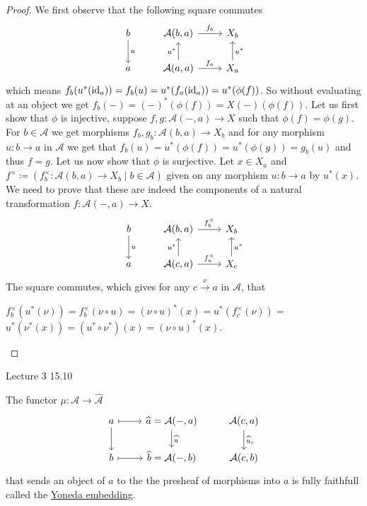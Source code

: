 \begin{proof}
    We first observe that the following square commutes
    \[
    \begin{tikzcd}
        b
        \arrow[d,"u"]
        &
        \mathcal{A}(b,a)
        \arrow[r,"f_b"]
        &
        X_b
        \\
        a
        &
        \mathcal{A}(a,a)
        \arrow[u,"u^*"]
        \arrow[r,"f_a"]
        &
        X_a
        \arrow[u,"u^*"']
    \end{tikzcd}
    \]
    which means $f_b(u^*(\operatorname{id}_a))=f_b(u)=u^*(f_a(\operatorname{id}_a))=u^*(\phi(f))$.
    So without evaluating at an object we get $f_b(-) = (-)^*(\phi(f))=X(-)(\phi(f))$.
    Let us first show that $\phi$ is injective, suppose $f,g\colon\mathcal{A}(-,a) \to X$ such that $\phi(f)=\phi(g)$.
    For $b \in \mathcal{A}$ we get morphisms $f_b,g_b\colon\mathcal{A}(b,a) \to X_b$ and for any morphism $u:b\to a$ in $\mathcal{A}$ we get that $f_b(u)=u^*(\phi(f))=u^*(\phi(g))=g_b(u)$ and thus $f=g$.
    Let us now show that $\phi$ is surjective.
    Let $x \in X_a$ and $f^\times\coloneqq ( f_b^\times\colon \mathcal{A}(b,a) \to X_b \mid b \in \mathcal{A})$ given on any morphism $u\colon b \to a$ by $u^*(x)$.
    We need to prove that these are indeed the components of a natural transformation $f\colon \mathcal{A}(-,a) \to X$.
    \[
    \begin{tikzcd}
        b
        \arrow[d,"u"]
        &
        \mathcal{A}(b,a)
        \arrow[r,"f_b^\times"]
        &
        X_b
        \\
        a
        &
        \mathcal{A}(c,a)
        \arrow[u,"u^*"]
        \arrow[r,"f_a^\times"]
        &
        X_c
        \arrow[u,"u^*"']
    \end{tikzcd}
    \]
    The square commutes, which gives for any $c \xrightarrow{\nu} a$ in $\mathcal{A}$, that 
    \begin{center}
        $f_b^\times(u^*(\nu)) = f_b^\times(\nu \circ u) = ( \nu \circ u)^*(x) =u^*(f^\times_c(\nu)) = $
        \\
        $u^*(\nu^*(x))=(u^* \circ \nu^*)(x)= (\nu \circ u)^*(x)$.
    \end{center}
\end{proof}

Lecture 3 15.10

\begin{thm}
\label{yoneda_embedding}
    The functor $\mu: \mathcal{A} \to \widehat{\mathcal{A}}$
    \[
    \begin{tikzcd}
        a
        \arrow[r,mapsto]
        \arrow[d]
        &
        \widehat{a}=\mathcal{A}(-,a)
        \arrow[d,"\widehat{u}"]
        &
        \mathcal{A}(c,a)
        \arrow[d,"\widehat{u}_c"]
        \\
        b
        \arrow[r,mapsto]
        &
        \widehat{b}=\mathcal{A}(-,b)
        &
        \mathcal{A}(c,b)
    \end{tikzcd}
    \]
    that sends an object of $a$ to the the presheaf of morphisms into $a$ is fully faithfull called the \underline{Yoneda embedding}.
\end{thm}

